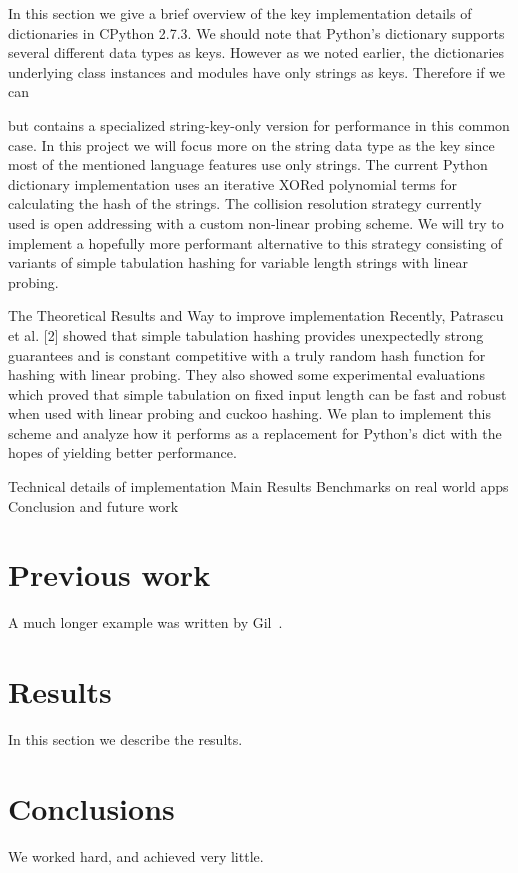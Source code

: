 \documentclass[12pt]{article}
\begin{document}
In this section we give a brief overview of the key implementation details of dictionaries in CPython 2.7.3.
We should note that Python’s dictionary supports several different data types as keys. However as we noted earlier, the dictionaries underlying class instances and modules have only strings as keys. Therefore if we can 

 but contains a specialized string-key-only version for performance in this common case. In this project we will focus more on the string data type as the key since most of the mentioned language features use only strings. The current Python dictionary implementation uses an iterative XORed polynomial terms for calculating the hash of the strings. The collision resolution strategy currently used is open addressing with a custom non-linear probing scheme. We will try to implement a hopefully more performant alternative to this strategy consisting of variants of simple tabulation hashing for variable length strings with linear probing.

The Theoretical Results and Way to improve implementation
Recently, Patrascu et al. [2] showed that simple tabulation hashing provides unexpectedly strong guarantees and is constant competitive with a truly random hash function for hashing with linear probing. They also showed some experimental evaluations which proved that simple tabulation on fixed input length can be fast and robust when used with linear probing and cuckoo hashing.   We plan to implement this scheme and analyze how it performs as a replacement for Python’s dict with the hopes of yielding better performance.

Technical details of implementation
Main Results
Benchmarks on real world apps
Conclusion and future work




\section{Previous work}\label{previous work}
A much longer \LaTeXe{} example was written by Gil~\cite{Gil:02}.

\section{Results}\label{results}
In this section we describe the results.

\section{Conclusions}\label{conclusions}
We worked hard, and achieved very little.



\end{document}
